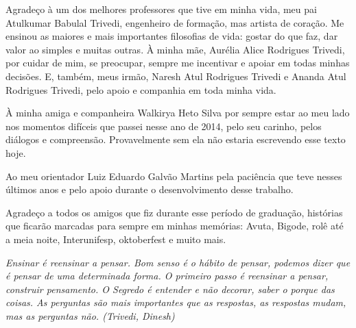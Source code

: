 \documentclass[	12pt, Times, openright, twoside, a4paper, english, brazil]{abntex2}
\begin{document}
\begin{agradecimentos}
Agradeço à um dos melhores professores que tive em minha vida, meu pai Atulkumar Babulal Trivedi, engenheiro de formação, mas artista de coração. Me ensinou as maiores e mais importantes filosofias de vida: gostar do que faz, dar valor ao simples e muitas outras. À minha mãe, Aurélia Alice Rodrigues Trivedi, por cuidar de mim, se preocupar, sempre me incentivar e apoiar em todas minhas decisões. E, também, meus irmão, Naresh Atul Rodrigues Trivedi e Ananda Atul Rodrigues Trivedi, pelo apoio e companhia em toda minha vida.

À minha amiga e companheira Walkirya Heto Silva por sempre estar ao meu lado nos momentos difíceis que passei nesse ano de 2014, pelo seu carinho, pelos diálogos e compreensão. Provavelmente sem ela não estaria escrevendo esse texto hoje.

Ao meu orientador Luiz Eduardo Galvão Martins pela paciência que teve nesses últimos anos e pelo apoio durante o desenvolvimento desse trabalho.

Agradeço a todos os amigos que fiz durante esse período de graduação, histórias que ficarão marcadas para sempre em minhas memórias: Avuta, Bigode, rolê até a meia noite, Interunifesp, oktoberfest e muito mais.

\end{agradecimentos}

\begin{epigrafe}
    \vspace*{\fill}
	\begin{flushright}
		\textit{Ensinar é reensinar a pensar. Bom senso é o hábito de pensar, podemos dizer que é pensar de uma determinada forma. O primeiro passo é reensinar a pensar, construir pensamento. O Segredo é entender e não decorar, saber o porque das coisas. As perguntas são mais importantes que as respostas, as respostas mudam, mas as perguntas não. (Trivedi, Dinesh)}
	\end{flushright}
\end{epigrafe}

\end{document}
